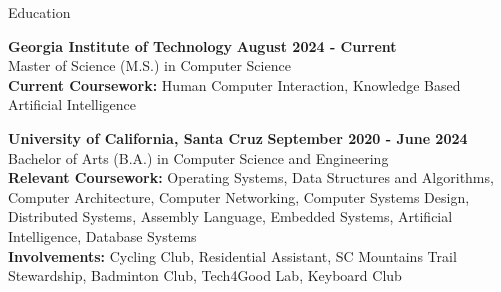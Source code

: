 \documentclass{resume}
\begin{document}
\begin{rSection}{\large Education}

{\bf Georgia Institute of Technology} \hfill {\bf{August 2024 - Current}}
\\ Master of Science (M.S.) in Computer Science\hfill %
\\ \textbf{Current Coursework:} Human Computer Interaction, Knowledge Based Artificial Intelligence


{\bf University of California, Santa Cruz} \hfill {\bf{September 2020 - June 2024}}
\\ Bachelor of Arts (B.A.) in Computer Science and Engineering\hfill %
\\ \textbf{Relevant Coursework:} Operating Systems, Data Structures and Algorithms, Computer Architecture, Computer Networking, Computer Systems Design, Distributed Systems, Assembly Language, Embedded Systems, Artificial Intelligence, Database Systems
\\ \textbf{Involvements:} Cycling Club, Residential Assistant, SC Mountains Trail Stewardship, Badminton Club, Tech4Good Lab, Keyboard Club 

\end{rSection}
\end{document}
